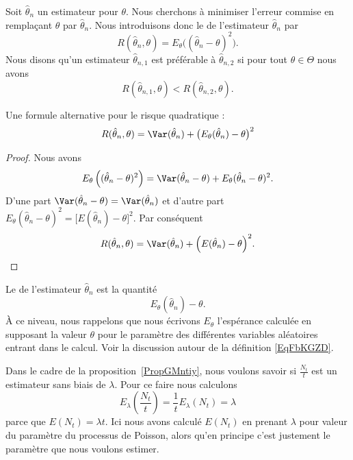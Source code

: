 Soit \( \hat\theta_n\) un estimateur pour \( \theta\). Nous cherchons à minimiser l'erreur commise en remplaçant \( \theta\) par \( \hat\theta_n\). Nous introduisons donc le  de l'estimateur \( \hat\theta_n\) par
\begin{equation}
	R(\hat\theta_n,\theta)=E_{\theta}\big( (\hat\theta_n-\theta)^2 \big).
\end{equation}
Nous disons qu'un estimateur \( \hat\theta_{n,1}\) est préférable à \( \hat\theta_{n,2}\) si pour tout \( \theta\in\Theta\) nous avons
\begin{equation}
	R(\hat\theta_{n,1},\theta)<R(\hat\theta_{n,2},\theta).
\end{equation}

\begin{lemma}
	Une formule alternative pour le risque quadratique :
	\begin{equation}
		R(\hat\theta_n,\theta)=\Var(\hat\theta_n)+\big( E_{\theta}(\hat\theta_n)-\theta \big)^2
	\end{equation}
\end{lemma}

\begin{proof}
	Nous avons
	\begin{equation}
		E_{\theta}\left( (\hat\theta_n-\theta)^2 \right)=\Var(\hat\theta_n-\theta)+E_{\theta}(\hat\theta_n-\theta)^2.
	\end{equation}
	D'une part \( \Var(\hat\theta_n-\theta)=\Var(\hat\theta_n)\) et d'autre part \( E_{\theta}(\hat\theta_n-\theta)^2=\big[ E(\hat\theta_n)-\theta \big]^2\). Par conséquent
	\begin{equation}    \label{EqRisqueetbaisiVar}
		R(\hat\theta_n,\theta)=\Var(\hat\theta_n)+\Big( E(\hat\theta_n)-\theta \Big)^2.
	\end{equation}
\end{proof}

Le  de l'estimateur \( \hat\theta_n\) est la quantité
\begin{equation}
	E_{\theta}(\hat\theta_n)-\theta.
\end{equation}
À ce niveau, nous rappelons que nous écrivons \( E_{\theta}\) l'espérance calculée en supposant la valeur \( \theta\) pour le paramètre des différentes variables aléatoires entrant dans le calcul. Voir la discussion autour de la définition \eqref{EqFbKGZD}.

\begin{example}     \label{ExytNlTq}
	Dans le cadre de la proposition~\ref{PropGMntiy}, nous voulons savoir si \( \frac{ N_t }{ t }\) est un estimateur sans biais de \( \lambda\). Pour ce faire nous calculons
	\begin{equation}
		E_{\lambda}\left( \frac{ N_t }{ t } \right)=\frac{1}{ t }E_{\lambda}(N_t)=\lambda
	\end{equation}
	parce que \( E(N_t)=\lambda t\). Ici nous avons calculé \( E(N_t)\) en prenant \( \lambda\) pour valeur du paramètre du processus de Poisson, alors qu'en principe c'est justement le paramètre que nous voulons estimer.
\end{example}

